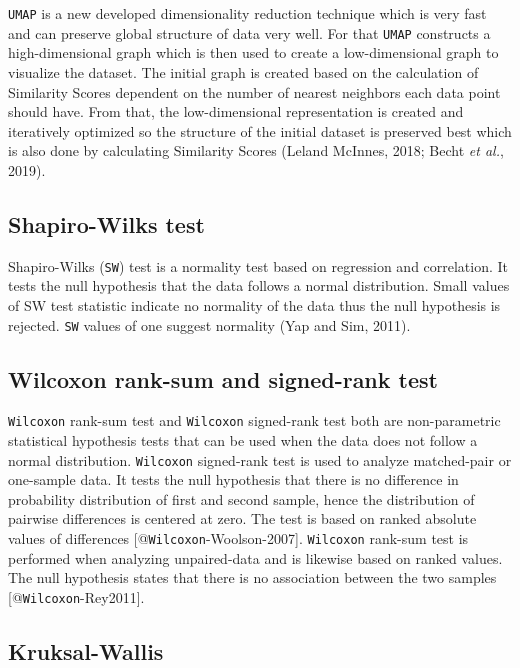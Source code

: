 \documentclass[
  parskip,
  oneside]{scrreprt}
\begin{document}
\texttt{UMAP} is a new developed dimensionality reduction technique
which is very fast and can preserve global structure of data very well.
For that \texttt{UMAP} constructs a high-dimensional graph which is then
used to create a low-dimensional graph to visualize the dataset. The
initial graph is created based on the calculation of Similarity Scores
dependent on the number of nearest neighbors each data point should
have. From that, the low-dimensional representation is created and
iteratively optimized so the structure of the initial dataset is
preserved best which is also done by calculating Similarity Scores
(Leland McInnes, 2018; Becht \emph{et al.}, 2019).

\hypertarget{shapiro-wilks-test}{%
\subsection{Shapiro-Wilks test}\label{shapiro-wilks-test}}

Shapiro-Wilks (\texttt{SW}) test is a normality test based on regression
and correlation. It tests the null hypothesis that the data follows a
normal distribution. Small values of SW test statistic indicate no
normality of the data thus the null hypothesis is rejected. \texttt{SW}
values of one suggest normality (Yap and Sim, 2011).

\hypertarget{wilcoxon-rank-sum-and-signed-rank-test}{%
\subsection{Wilcoxon rank-sum and signed-rank
test}\label{wilcoxon-rank-sum-and-signed-rank-test}}

\texttt{Wilcoxon} rank-sum test and \texttt{Wilcoxon} signed-rank test
both are non-parametric statistical hypothesis tests that can be used
when the data does not follow a normal distribution. \texttt{Wilcoxon}
signed-rank test is used to analyze matched-pair or one-sample data. It
tests the null hypothesis that there is no difference in probability
distribution of first and second sample, hence the distribution of
pairwise differences is centered at zero. The test is based on ranked
absolute values of differences {[}@\texttt{Wilcoxon}-Woolson-2007{]}.
\texttt{Wilcoxon} rank-sum test is performed when analyzing
unpaired-data and is likewise based on ranked values. The null
hypothesis states that there is no association between the two samples
{[}@\texttt{Wilcoxon}-Rey2011{]}.

\hypertarget{kruksal-wallis}{%
\subsection{Kruksal-Wallis}\label{kruksal-wallis}}
\end{document}
